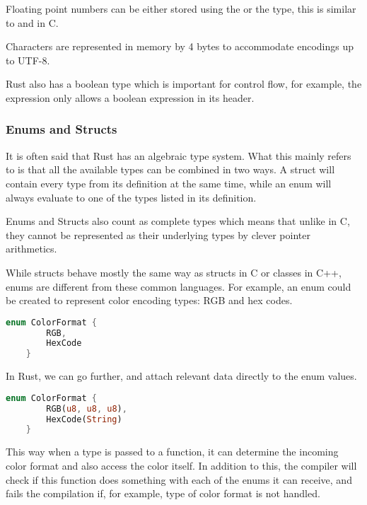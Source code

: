 Floating point numbers can be either stored using the  or the  type, this is similar to  and  in C.

Characters are represented in memory by 4 bytes to accommodate encodings up to UTF-8.

Rust also has a boolean type which is important for control flow, for example, the  expression only allows a boolean expression in its header.

\subsubsection{Enums and Structs}

It is often said that Rust has an algebraic type system. What this mainly refers to is that all the available types can be combined in two ways. A struct will contain every type from its definition at the same time, while an enum will always evaluate to one of the types listed in its definition.

Enums and Structs also count as complete types which means that unlike in C, they cannot be represented as their underlying types by clever pointer arithmetics.

While structs behave mostly the same way as structs in C or classes in C++, enums are different from these common languages. For example, an enum could be created to represent color encoding types: RGB and hex codes.

\begin{lstlisting}[language=Rust,frame=single,float=!ht,style=customrust,label={lst:rust-enum},caption={Rust Enum Example}]
    enum ColorFormat {
        RGB,
        HexCode
    }
\end{lstlisting}

In Rust, we can go further, and attach relevant data directly to the enum values.

\begin{lstlisting}[language=Rust,frame=single,float=!ht,style=customrust,label={lst:rust-enum-advanced},caption={Rust Enum Example With Data}]
    enum ColorFormat {
        RGB(u8, u8, u8),
        HexCode(String)
    }
\end{lstlisting}

This way when a  type is passed to a function, it can determine the incoming color format and also access the color itself. In addition to this, the compiler will check if this function does something with each of the enums it can receive, and fails the compilation if, for example,  type of color format is not handled.

